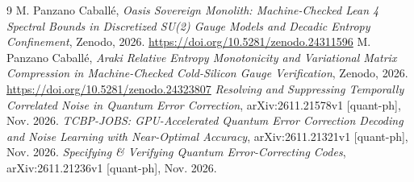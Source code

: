 \documentclass[11pt,a4paper]{article}
\begin{document}
\begin{thebibliography}{9}
 M. Panzano Caball\'e, \emph{Oasis Sovereign Monolith: Machine-Checked Lean 4 Spectral Bounds in Discretized SU(2) Gauge Models and Decadic Entropy Confinement}, Zenodo, 2026. \url{https://doi.org/10.5281/zenodo.24311596}
 M. Panzano Caball\'e, \emph{Araki Relative Entropy Monotonicity and Variational Matrix Compression in Machine-Checked Cold-Silicon Gauge Verification}, Zenodo, 2026. \url{https://doi.org/10.5281/zenodo.24323807}
 \emph{Resolving and Suppressing Temporally Correlated Noise in Quantum Error Correction}, arXiv:2611.21578v1 [quant-ph], Nov. 2026.
 \emph{TCBP-JOBS: GPU-Accelerated Quantum Error Correction Decoding and Noise Learning with Near-Optimal Accuracy}, arXiv:2611.21321v1 [quant-ph], Nov. 2026.
 \emph{Specifying \& Verifying Quantum Error-Correcting Codes}, arXiv:2611.21236v1 [quant-ph], Nov. 2026.
\end{thebibliography}
\end{document}
